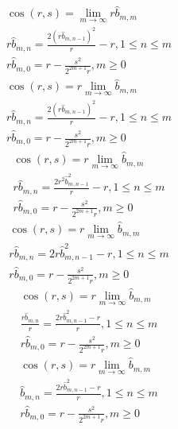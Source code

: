 \documentclass[a4paper,12pt]{report}
\begin{document}
\begin{subequations}
\begin{gather}
\cos(r,s) = \lim \limits_{m \to \infty} r \hat{b}_{m,m} \\
r \hat{b}_{m,n} = \frac{2 (r \hat{b}_{m,n-1})^2}{r} - r, 1 \leq n \leq m \\
r \hat{b}_{m,0} = r - \frac{s^2}{2^{2m+1}r}, m \geq 0
\end{gather}
\end{subequations}
\begin{subequations}
\begin{gather}
\cos(r,s) = r \lim \limits_{m \to \infty} \hat{b}_{m,m} \\
r \hat{b}_{m,n} = \frac{2 (r \hat{b}_{m,n-1})^2}{r} - r, 1 \leq n \leq m \\
r \hat{b}_{m,0} = r - \frac{s^2}{2^{2m+1}r}, m \geq 0
\end{gather}
\end{subequations}
\begin{subequations}
\begin{gather}
\cos(r,s) = r \lim \limits_{m \to \infty} \hat{b}_{m,m} \\
r \hat{b}_{m,n} = \frac{2r^2 \hat{b}_{m,n-1}^2}{r} - r, 1 \leq n \leq m \\
r \hat{b}_{m,0} = r - \frac{s^2}{2^{2m+1}r}, m \geq 0
\end{gather}
\end{subequations}
\begin{subequations}
\begin{gather}
\cos(r,s) = r \lim \limits_{m \to \infty} \hat{b}_{m,m} \\
r \hat{b}_{m,n} = 2r \hat{b}_{m,n-1}^2 - r, 1 \leq n \leq m \\
r \hat{b}_{m,0} = r - \frac{s^2}{2^{2m+1}r}, m \geq 0
\end{gather}
\end{subequations}
\begin{subequations}
\begin{gather}
\cos(r,s) = r \lim \limits_{m \to \infty} \hat{b}_{m,m} \\
\frac{r \hat{b}_{m,n}}{r} = \frac{2r \hat{b}_{m,n-1}^2 - r}{r}, 1 \leq n \leq m \\
r \hat{b}_{m,0} = r - \frac{s^2}{2^{2m+1}r}, m \geq 0
\end{gather}
\end{subequations}
\begin{subequations}
\begin{gather}
\cos(r,s) = r \lim \limits_{m \to \infty} \hat{b}_{m,m} \\
\hat{b}_{m,n} = \frac{2r \hat{b}_{m,n-1}^2 - r}{r}, 1 \leq n \leq m \\
r \hat{b}_{m,0} = r - \frac{s^2}{2^{2m+1}r}, m \geq 0
\end{gather}
\end{subequations}
\end{document}
